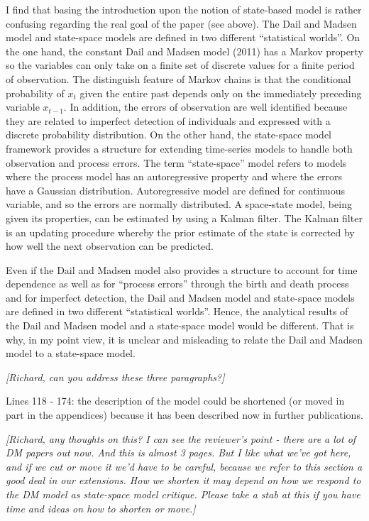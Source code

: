\documentclass[12pt,english]{article}
\begin{document}
\begin{spacing}{1.9}
\begin{flushleft}
I find that basing the introduction upon the notion of state-based model is rather confusing
regarding the real goal of the paper (see above). The Dail and Madsen model and state-space
models are defined in two different ``statistical worlds''. On the one hand, the constant
Dail and Madsen model (2011) has a Markov property so the variables can only take on a
finite set of discrete values for a finite period of observation. The distinguish feature of
Markov chains is that the conditional probability of $x_{t}$ given the entire past depends only on
the immediately preceding variable $x_{t-1}$. In addition, the errors of observation are well
identified because they are related to imperfect detection of individuals and expressed with
a discrete probability distribution. On the other hand, the state-space model framework
provides a structure for extending time-series models to handle both observation and
process errors. The term ``state-space'' model refers to models where the process model has
an autoregressive property and where the errors have a Gaussian distribution.
Autoregressive model are defined for continuous variable, and so the errors are normally
distributed. A space-state model, being given its properties, can be estimated by using a
Kalman filter. The Kalman filter is an updating procedure whereby the prior estimate of the
state is corrected by how well the next observation can be predicted.

Even if the Dail and Madsen model also provides a structure to account for time dependence
as well as for ``process errors'' through the birth and death process and for imperfect
detection, the Dail and Madsen model and state-space models are defined in two different
``statistical worlds''. Hence, the analytical results of the Dail and Madsen model and a state-space
model would be different. That is why, in my point view, it is unclear and misleading to
relate the Dail and Madsen model to a state-space model.

\vspace{0.5cm}
\textit{[Richard, can you address these three paragraphs?]}
\vspace{0.5cm}

Lines 118 - 174: the description of the model could be shortened (or moved in part in the
appendices) because it has been described now in further publications.

\vspace{0.5cm}
\textit{[Richard, any thoughts on this?  I can see the reviewer's point - there are a lot of DM
papers out now.  And this is almost 3 pages.  But I like what we've got here, and if we cut or
move it we'd have to be careful, because we refer to this section a good deal in our extensions.
How we shorten it may depend on how we respond to the DM model as state-space model critique.
Please take a stab at this if you have time and ideas on how to shorten or move.]}
\vspace{0.5cm}


\end{flushleft}
\end{spacing}
\end{document}
